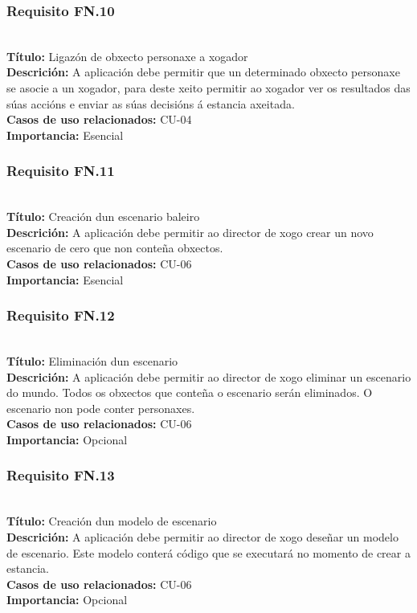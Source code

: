 \subsubsection{Requisito FN.10}~\\
{\bf Título:} Ligazón de obxecto personaxe a xogador\\
{\bf Descrición:} A aplicación debe permitir que un determinado obxecto
personaxe se asocie a un xogador, para deste xeito permitir ao xogador ver os
resultados das súas accións e enviar as súas decisións á estancia axeitada.\\
{\bf Casos de uso relacionados:} CU-04\\
{\bf Importancia:} Esencial

\subsubsection{Requisito FN.11}~\\
{\bf Título:} Creación dun escenario baleiro\\
{\bf Descrición:} A aplicación debe permitir ao director de xogo crear un novo
escenario de cero que non conteña obxectos.\\
{\bf Casos de uso relacionados:} CU-06\\
{\bf Importancia:} Esencial

\subsubsection{Requisito FN.12}~\\
{\bf Título:} Eliminación dun escenario\\
{\bf Descrición:} A aplicación debe permitir ao director de xogo eliminar un
escenario do mundo. Todos os obxectos que conteña o escenario serán eliminados.
O escenario non pode conter personaxes.\\
{\bf Casos de uso relacionados:} CU-06\\
{\bf Importancia:} Opcional

\subsubsection{Requisito FN.13}~\\
{\bf Título:} Creación dun modelo de escenario\\
{\bf Descrición:} A aplicación debe permitir ao director de xogo deseñar un
modelo de escenario. Este modelo conterá código que se executará no momento de
crear a estancia.\\
{\bf Casos de uso relacionados:} CU-06\\
{\bf Importancia:} Opcional

